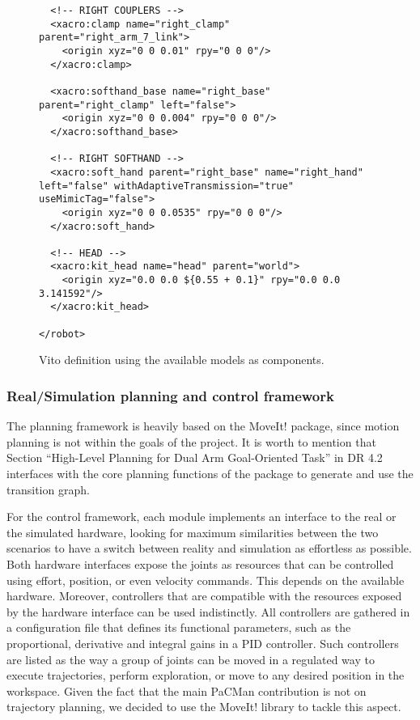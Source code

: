 \begin{figure}
\begin{verbatim}
  <!-- RIGHT COUPLERS -->
  <xacro:clamp name="right_clamp" parent="right_arm_7_link">
    <origin xyz="0 0 0.01" rpy="0 0 0"/>
  </xacro:clamp>

  <xacro:softhand_base name="right_base" parent="right_clamp" left="false">
    <origin xyz="0 0 0.004" rpy="0 0 0"/>
  </xacro:softhand_base>

  <!-- RIGHT SOFTHAND -->
  <xacro:soft_hand parent="right_base" name="right_hand" left="false" withAdaptiveTransmission="true" useMimicTag="false">
    <origin xyz="0 0 0.0535" rpy="0 0 0"/>
  </xacro:soft_hand>

  <!-- HEAD -->
  <xacro:kit_head name="head" parent="world">
    <origin xyz="0.0 0.0 ${0.55 + 0.1}" rpy="0.0 0.0 3.141592"/>
  </xacro:kit_head>

</robot>
\end{verbatim}
\caption{Vito definition using the available models as components.}
\label{fig:vito}
\end{figure}


\subsubsection{Real/Simulation planning and control framework}

The planning framework is heavily based on the MoveIt! package, since motion planning is not within the goals of the project. It is worth to mention that Section ``High-Level Planning for Dual Arm Goal-Oriented Task'' in DR 4.2 interfaces with the core planning functions of the package to generate and use the transition graph.

For the control framework, each module implements an interface to the real or the simulated hardware, looking for maximum similarities between the two scenarios to have a switch between reality and simulation as effortless as possible. Both hardware interfaces expose the joints as resources that can be controlled using effort, position, or even velocity commands. This depends on the available hardware. Moreover, controllers that are compatible with the resources exposed by the hardware interface can be used indistinctly. All controllers are gathered in a configuration file that defines its functional parameters, such as the proportional, derivative and integral gains in a PID controller. Such controllers are listed as the way a group of joints can be moved in a regulated way to execute trajectories, perform exploration, or move to any desired position in the workspace. Given the fact that the main PaCMan contribution is not on trajectory planning, we decided to use the MoveIt! library to tackle this aspect.

